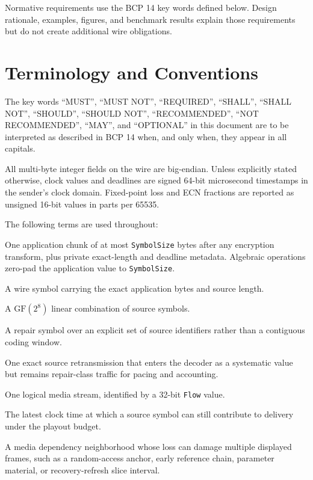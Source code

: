 \documentclass[11pt]{article}
\newcommand{\code}[1]{\ifmmode\text{\texttt{#1}}\else\texttt{#1}\fi}
\newcommand{\field}[1]{\code{#1}}
\newcommand{\gf}{\ensuremath{\mathrm{GF}(2^8)}}
\begin{document}
Normative requirements use the BCP 14 key words defined below. Design rationale,
examples, figures, and benchmark results explain those requirements but do not
create additional wire obligations.

\section*{Terminology and Conventions}
\label{sec:terminology}
{}

The key words ``MUST'', ``MUST NOT'', ``REQUIRED'', ``SHALL'', ``SHALL NOT'',
``SHOULD'', ``SHOULD NOT'', ``RECOMMENDED'', ``NOT RECOMMENDED'', ``MAY'', and
``OPTIONAL'' in this document are to be interpreted as described in BCP 14
\cite{rfc2119,rfc8174} when, and only when, they appear in all capitals.

All multi-byte integer fields on the wire are big-endian. Unless explicitly
stated otherwise, clock values and deadlines are signed 64-bit microsecond
timestamps in the sender's clock domain. Fixed-point loss and ECN fractions are
reported as unsigned 16-bit values in parts per 65535.

The following terms are used throughout:

\begin{description}[leftmargin=2.3cm,style=nextline]
\item[Source symbol]
  One application chunk of at most \field{SymbolSize} bytes after any encryption
  transform, plus private exact-length and deadline metadata. Algebraic operations
  zero-pad the application value to \field{SymbolSize}.
\item[Systematic symbol]
  A wire symbol carrying the exact application bytes and source length.
\item[Repair symbol]
  A \gf{} linear combination of source symbols.
\item[Sparse repair]
  A repair symbol over an explicit set of source identifiers rather than a
  contiguous coding window.
\item[Unit repair]
  One exact source retransmission that enters the decoder as a systematic value
  but remains repair-class traffic for pacing and accounting.
\item[Flow]
  One logical media stream, identified by a 32-bit \field{Flow} value.
\item[Deadline]
  The latest clock time at which a source symbol can still contribute to
  delivery under the playout budget.
\item[Dependency island]
  A media dependency neighborhood whose loss can damage multiple displayed
  frames, such as a random-access anchor, early reference chain, parameter
  material, or recovery-refresh slice interval.
\end{description}
\end{document}
